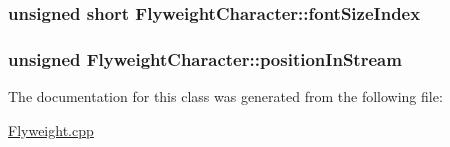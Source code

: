 \subsubsection[{\texorpdfstring{font\+Size\+Index}{fontSizeIndex}}]{\setlength{\rightskip}{0pt plus 5cm}unsigned short Flyweight\+Character\+::font\+Size\+Index\hspace{0.3cm}{\ttfamily [private]}}\hypertarget{classFlyweightCharacter_ad2633bab3a73c5fac2b3d251bf5c2bfe}{}\label{classFlyweightCharacter_ad2633bab3a73c5fac2b3d251bf5c2bfe}
\subsubsection[{\texorpdfstring{position\+In\+Stream}{positionInStream}}]{\setlength{\rightskip}{0pt plus 5cm}unsigned Flyweight\+Character\+::position\+In\+Stream\hspace{0.3cm}{\ttfamily [private]}}\hypertarget{classFlyweightCharacter_a55c3d15287653717920c8b498d904a08}{}\label{classFlyweightCharacter_a55c3d15287653717920c8b498d904a08}


The documentation for this class was generated from the following file\+:\begin{DoxyCompactItemize}
\item 
\hyperlink{Flyweight_8cpp}{Flyweight.\+cpp}\end{DoxyCompactItemize}
